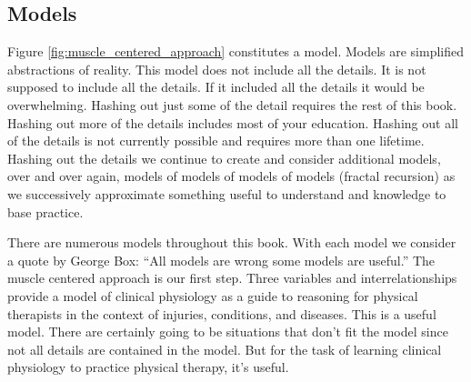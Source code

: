 
\subsection{Models}

Figure \ref{fig:muscle_centered_approach} constitutes a model. Models are simplified abstractions of reality. This model does not include all the details. It is not supposed to include all the details. If it included all the details it would be overwhelming. Hashing out just some of the detail requires the rest of this book. Hashing out more of the details includes most of your education. Hashing out all of the details is not currently possible and requires more than one lifetime.\footnotemark{} Hashing out the details we continue to create and consider additional models, over and over again, models of models of models of models (fractal recursion) as we successively approximate something useful to understand and knowledge to base practice.

There are numerous models throughout this book. With each model we consider a quote by George Box: “All models are wrong some models are useful.” The muscle centered approach is our first step. Three variables and interrelationships provide a model of clinical physiology as a guide to reasoning for physical therapists in the context of injuries, conditions, and diseases. This is a useful model. There are certainly going to be situations that don’t fit the model since not all details are contained in the model. But for the task of learning clinical physiology to practice physical therapy, it's useful. 

